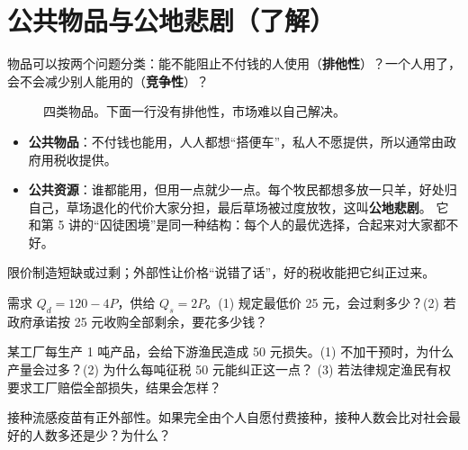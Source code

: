 \section{公共物品与公地悲剧（了解）}

物品可以按两个问题分类：能不能阻止不付钱的人使用（\textbf{排他性}）？一个人用了，会不会减少别人能用的（\textbf{竞争性}）？

\begin{figure}[!htbp]
\centering
{}
\caption{四类物品。下面一行没有排他性，市场难以自己解决。}
\label{fig:es-goods}
\end{figure}

\begin{itemize}
  \item \textbf{公共物品}：不付钱也能用，人人都想“搭便车”，私人不愿提供，所以通常由政府用税收提供。
  \item \textbf{公共资源}：谁都能用，但用一点就少一点。每个牧民都想多放一只羊，好处归自己，草场退化的代价大家分担，最后草场被过度放牧，这叫\textbf{公地悲剧}。
        它和第 5 讲的“囚徒困境”是同一种结构：每个人的最优选择，合起来对大家都不好。
\end{itemize}

\begin{oneline}
限价制造短缺或过剩；外部性让价格“说错了话”，好的税收能把它纠正过来。
\end{oneline}

\begin{exercises}[练一练]
  \item 需求 $Q_d=120-4P$，供给 $Q_s=2P$。(1) 规定最低价 25 元，会过剩多少？(2) 若政府承诺按 25 元收购全部剩余，要花多少钱？
  \item 某工厂每生产 1 吨产品，会给下游渔民造成 50 元损失。(1) 不加干预时，为什么产量会过多？(2) 为什么每吨征税 50 元能纠正这一点？
        (3) 若法律规定渔民有权要求工厂赔偿全部损失，结果会怎样？
  \item 接种流感疫苗有正外部性。如果完全由个人自愿付费接种，接种人数会比对社会最好的人数多还是少？为什么？
\end{exercises}
